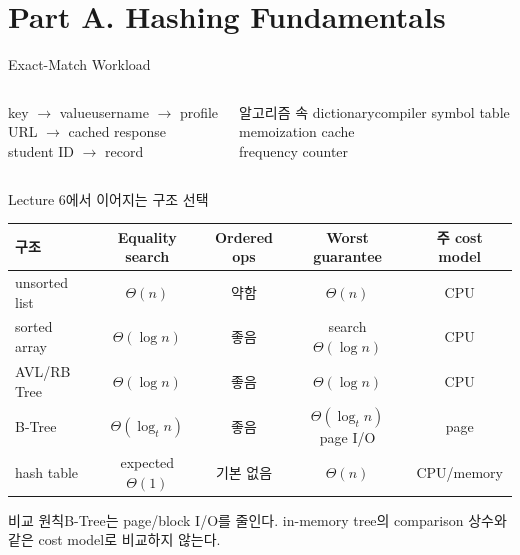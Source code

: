 \section{Part A. Hashing Fundamentals}
\begin{frame}{Exact-Match Workload}
\begin{columns}[T]
\begin{block}{key $\to$ value}username $\to$ profile\\URL $\to$ cached response\\student ID $\to$ record\end{block}
\begin{block}{알고리즘 속 dictionary}compiler symbol table\\memoization cache\\frequency counter\end{block}
\end{columns}
\end{frame}
\begin{frame}{Lecture 6에서 이어지는 구조 선택}
\scriptsize\centering
\begin{tabular}{lcccc}\toprule
구조&Equality search&Ordered ops&Worst guarantee&주 cost model\\\midrule
unsorted list&$\Theta(n)$&약함&$\Theta(n)$&CPU\\
sorted array&$\Theta(\log n)$&좋음&search $\Theta(\log n)$&CPU\\
AVL/RB Tree&$\Theta(\log n)$&좋음&$\Theta(\log n)$&CPU\\
B-Tree&$\Theta(\log_t n)$&좋음&$\Theta(\log_t n)$ page I/O&page\\
hash table&expected $\Theta(1)$&기본 없음&$\Theta(n)$&CPU/memory\\\bottomrule
\end{tabular}
\begin{alertblock}{비교 원칙}B-Tree는 page/block I/O를 줄인다. in-memory tree의 comparison 상수와 같은 cost model로 비교하지 않는다.\end{alertblock}
\end{frame}
